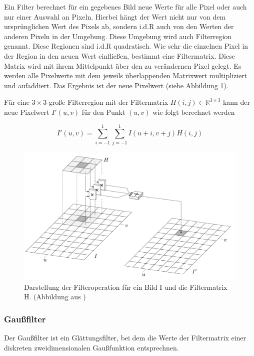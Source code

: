 Ein Filter berechnet für ein gegebenes Bild neue Werte für alle Pixel oder auch nur einer Auswahl an Pixeln. Hierbei hängt der Wert nicht nur von dem ursprünglichen Wert des Pixels ab, sondern i.d.R auch von den Werten der anderen Pixeln in der Umgebung. Diese Umgebung wird auch Filterregion genannt. Diese Regionen sind i.d.R quadratisch.
Wie sehr die einzelnen Pixel in der Region in den neuen Wert einfließen, bestimmt eine Filtermatrix. Diese Matrix wird mit ihrem Mittelpunkt über den zu verändernen Pixel gelegt. Es werden alle Pixelwerte mit dem jeweils überlappenden Matrixwert multipliziert und aufaddiert. Das Ergebnis ist der neue Pixelwert (siehe Abbildung \ref{fig:filter}). 

Für eine $3 \times 3$ große Filterregion mit der Filtermatrix $H(i, j) \in \mathbb{R}^{3 \times 3}$ kann der neue Pixelwert $I'(u, v)$ für den Punkt $(u, v)$ wie folgt berechnet werden

\[
I'(u, v) = \sum_{i = -1}^1 \sum_{j = -1}^1  I(u + i, v + j) H(i, j)
\]


\begin{figure}[h]
    \centering
		\includegraphics[scale=0.35]{bilder/filter.png}
    	\caption{Darstellung der Filteroperation für ein Bild I und die Filtermatrix H. (Abbildung aus \cite[S. 92]{Burg06})}
    	\label{fig:filter}
\end{figure}

\subsubsection{Gaußfilter}

Der Gaußfilter ist ein Glättungsfilter, bei dem die Werte der Filtermatrix einer diskreten zweidimensionalen Gaußfunktion entsprechnen.

